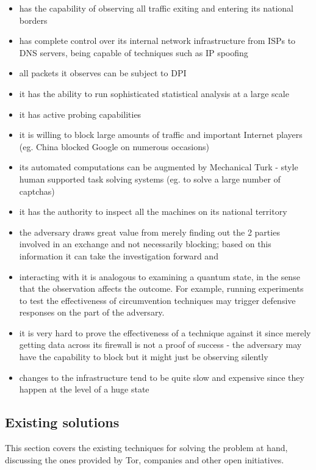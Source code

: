 \documentclass[11pt]{book} %
\begin{document}
\begin{itemize}
\item has the capability of observing all traffic exiting and entering its national borders
\item has complete control over its internal network infrastructure from ISPs to DNS servers, being capable  of techniques such as IP spoofing
\item all packets it observes can be subject to DPI 
\item it has the ability to run sophisticated statistical analysis at a large scale
\item it has active probing capabilities 
\item it is willing to block large amounts of traffic and important Internet players (eg. China blocked Google on numerous occasions)
\item its automated computations can be augmented by Mechanical Turk - style human supported task solving systems (eg. to solve a large number of captchas)
\item it has the authority to inspect all the machines on its national territory
\item the adversary draws great value from merely finding out the 2 parties involved in an exchange and not necessarily blocking; based on this information it can take the investigation forward and 
\item interacting with it is analogous to examining a quantum state, in the sense that the observation affects the outcome. For example, running experiments to test the effectiveness of circumvention techniques may trigger defensive responses on the part of the adversary.
\item it is very hard to prove the effectiveness of a technique against it since merely getting data across its firewall is not a proof of success - the adversary may have the capability to block but it might just be observing silently
\item changes to the infrastructure tend to be quite slow and expensive since they happen at the level of a huge state
\end{itemize}

\subsection{Existing solutions}

This section covers the existing techniques for solving the problem at hand, discussing the ones provided by Tor, companies and other open initiatives.
 
\end{document}
